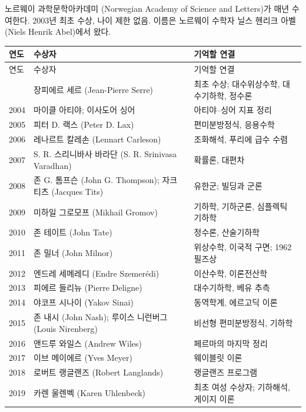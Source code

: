 \begin{fact}[아벨상 기본]
노르웨이 과학문학아카데미 (Norwegian Academy of Science and Letters)가 매년 수여한다. 2003년 최초 수상, 나이 제한 없음. 이름은 노르웨이 수학자 닐스 헨리크 아벨 (Niels Henrik Abel)에서 왔다.
\end{fact}

\begin{center}
\small
\renewcommand{\arraystretch}{1.03}
\begin{longtable}{@{}L{0.075\textwidth}L{0.31\textwidth}L{0.525\textwidth}@{}}
\toprule
연도 & 수상자 & 기억할 연결\\
\midrule
\endfirsthead
\toprule 연도 & 수상자 & 기억할 연결\\ \midrule \endhead
\bottomrule{} & 장피에르 세르 (Jean-Pierre Serre) & 최초 수상; 대수위상수학, 대수기하학, 정수론\\
2004 & 마이클 아티야; 이사도어 싱어 & 아티야--싱어 지표 정리\\
2005 & 피터 D. 랙스 (Peter D. Lax) & 편미분방정식, 응용수학\\
2006 & 레나르트 칼레손 (Lennart Carleson) & 조화해석, 푸리에 급수 수렴\\
2007 & S. R. 스리니바사 바라단 (S. R. Srinivasa Varadhan) & 확률론, 대편차\\
2008 & 존 G. 톰프슨 (John G. Thompson); 자크 티츠 (Jacques Tits) & 유한군; 빌딩과 군론\\
2009 & 미하일 그로모프 (Mikhail Gromov) & 기하학, 기하군론, 심플렉틱 기하학\\
2010 & 존 테이트 (John Tate) & 정수론, 산술기하학\\
2011 & 존 밀너 (John Milnor) & 위상수학, 이국적 구면; 1962 필즈상\\
2012 & 엔드레 세메레디 (Endre Szemerédi) & 이산수학, 이론전산학\\
2013 & 피에르 들리뉴 (Pierre Deligne) & 대수기하학, 베유 추측\\
2014 & 야코프 시나이 (Yakov Sinai) & 동역학계, 에르고딕 이론\\
2015 & 존 내시 (John Nash); 루이스 니런버그 (Louis Nirenberg) & 비선형 편미분방정식, 기하학\\
2016 & 앤드루 와일스 (Andrew Wiles) & 페르마의 마지막 정리\\
2017 & 이브 메이에르 (Yves Meyer) & 웨이블릿 이론\\
2018 & 로버트 랭글랜즈 (Robert Langlands) & 랭글랜즈 프로그램\\
2019 & 카렌 울렌벡 (Karen Uhlenbeck) & 최초 여성 수상자; 기하해석, 게이지 이론\\

\end{longtable}
\end{center}
